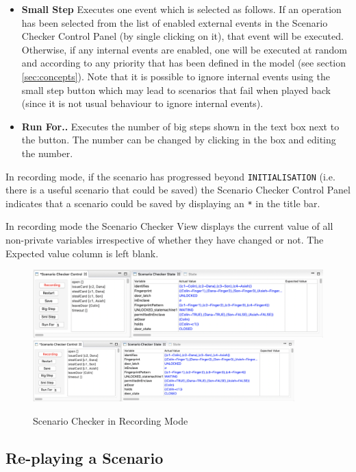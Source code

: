 \begin{itemize}
	\item \textbf{Small Step}  Executes one event which is selected as follows. If an operation has been selected from the list of enabled external events in the Scenario Checker Control Panel (by single clicking on it), that event will be executed. Otherwise, if any internal events are enabled, one will be executed at random and according to any priority that has been defined in the model (see section \ref{sec:concepts}). Note that it is possible to ignore internal events using the small step button which may lead to scenarios that fail when played back (since it is not usual behaviour to ignore internal events).
	\item \textbf{Run For..}  Executes the number of big steps shown in the text box next to the button. The number can be changed by clicking in the box and editing the number.
\end{itemize}

In recording mode, if the scenario has progressed beyond \texttt{INITIALISATION} (i.e. there is a useful scenario that could be saved) the Scenario Checker Control Panel indicates that a scenario could be saved by displaying an \texttt{*} in the title bar.

In recording mode the Scenario Checker View displays the current value of all non-private variables irrespective of whether they have changed or not.
The Expected value column is left blank.

	
\begin{figure}[!htbp]
	\centering
	\ifplastex
	\includegraphics[width=900]{figures/recording}
	\else
	\includegraphics[width=0.9\textwidth]{figures/recording}
	\fi
	\caption{Scenario Checker in Recording Mode}
	\label{fig:recording}
\end{figure}

\subsection{Re-playing a Scenario}
\label{sec:playback}

